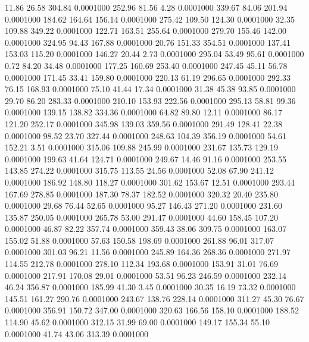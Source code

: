  11.86   26.58  304.84   0.0001000
 252.96   81.56    4.28   0.0001000
 339.67   84.06  201.94   0.0001000
 184.62  164.64  156.14   0.0001000
 275.42  109.50  124.30   0.0001000
  32.35  109.88  349.22   0.0001000
 122.71  163.51  255.64   0.0001000
 279.70  155.46  142.00   0.0001000
 324.95   94.43  167.88   0.0001000
  20.76  151.33  354.51   0.0001000
 137.41  153.03  115.20   0.0001000
 146.27   20.44    2.73   0.0001000
 295.04   53.49   95.61   0.0001000
   0.72   84.20   34.48   0.0001000
 177.25  160.69  253.40   0.0001000
 247.45   45.11   56.78   0.0001000
 171.45   33.41  159.80   0.0001000
 220.13   61.19  296.65   0.0001000
 292.33   76.15  168.93   0.0001000
  75.10   41.44   17.34   0.0001000
  31.38   45.38   93.85   0.0001000
  29.70   86.20  283.33   0.0001000
 210.10  153.93  222.56   0.0001000
 295.13   58.81   99.36   0.0001000
 139.15  138.82  334.36   0.0001000
  64.82   89.80   12.11   0.0001000
  86.17  121.20  252.17   0.0001000
 345.98  139.03  359.56   0.0001000
 291.49  128.41   22.38   0.0001000
  98.52   23.70  327.44   0.0001000
 248.63  104.39  356.19   0.0001000
  54.61  152.21    3.51   0.0001000
 315.06  109.88  245.99   0.0001000
 231.67  135.73  129.19   0.0001000
 199.63   41.64  124.71   0.0001000
 249.67   14.46   91.16   0.0001000
 253.55  143.85  274.22   0.0001000
 315.75  113.55   24.56   0.0001000
  52.08   67.90  241.12   0.0001000
 186.92  148.80  118.27   0.0001000
 301.62  153.67   12.51   0.0001000
 293.44  167.69  278.85   0.0001000
 187.30   78.37  182.52   0.0001000
 320.32   20.40  235.80   0.0001000
  29.68   76.44   52.65   0.0001000
  95.27  146.43  271.20   0.0001000
 231.60  135.87  250.05   0.0001000
 265.78   53.00  291.47   0.0001000
  44.60  158.45  107.20   0.0001000
  46.87   82.22  357.74   0.0001000
 359.43   38.06  309.75   0.0001000
 163.07  155.02   51.88   0.0001000
  57.63  150.58  198.69   0.0001000
 261.88   96.01  317.07   0.0001000
 301.03   96.21   11.56   0.0001000
 245.89  164.36  268.36   0.0001000
 271.97  114.55  212.78   0.0001000
 278.10  112.34  193.68   0.0001000
 153.91   31.01   76.69   0.0001000
 217.91  170.08   29.01   0.0001000
  53.51   96.23  246.59   0.0001000
 232.14   46.24  356.87   0.0001000
 185.99   41.30    3.45   0.0001000
  30.35   16.19   73.32   0.0001000
 145.51  161.27  290.76   0.0001000
 243.67  138.76  228.14   0.0001000
 311.27   45.30   76.67   0.0001000
 356.91  150.72  347.00   0.0001000
 320.63  166.56  158.10   0.0001000
 188.52  114.90   45.62   0.0001000
 312.15   31.99   69.00   0.0001000
 149.17  155.34   55.10   0.0001000
  41.74   43.06  313.39   0.0001000
